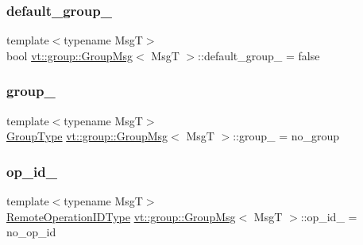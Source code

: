 \subsubsection{\texorpdfstring{default\+\_\+group\+\_\+}{default\_group\_}}
{\footnotesize\ttfamily template$<$typename MsgT$>$ \\
bool \hyperlink{structvt_1_1group_1_1_group_msg}{vt\+::group\+::\+Group\+Msg}$<$ MsgT $>$\+::default\+\_\+group\+\_\+ = false\hspace{0.3cm}{\ttfamily [protected]}}

\mbox{\label{structvt_1_1group_1_1_group_msg_a490c257a68f857c6833804c065cb5d4f}} 
\subsubsection{\texorpdfstring{group\+\_\+}{group\_}}
{\footnotesize\ttfamily template$<$typename MsgT$>$ \\
\hyperlink{namespacevt_a27b5e4411c9b6140c49100e050e2f743}{Group\+Type} \hyperlink{structvt_1_1group_1_1_group_msg}{vt\+::group\+::\+Group\+Msg}$<$ MsgT $>$\+::group\+\_\+ = no\+\_\+group\hspace{0.3cm}{\ttfamily [protected]}}

\mbox{\label{structvt_1_1group_1_1_group_msg_a7914cacc92ff971aca0b9b2dc3cb86a3}} 
\subsubsection{\texorpdfstring{op\+\_\+id\+\_\+}{op\_id\_}}
{\footnotesize\ttfamily template$<$typename MsgT$>$ \\
\hyperlink{namespacevt_1_1group_a73f2624ddeb535b39a08b6524f26b244}{Remote\+Operation\+I\+D\+Type} \hyperlink{structvt_1_1group_1_1_group_msg}{vt\+::group\+::\+Group\+Msg}$<$ MsgT $>$\+::op\+\_\+id\+\_\+ = no\+\_\+op\+\_\+id\hspace{0.3cm}{\ttfamily [protected]}}

\mbox{\label{structvt_1_1group_1_1_group_msg_a79b75c7a2a3e2788132bd494148e5952}} 
